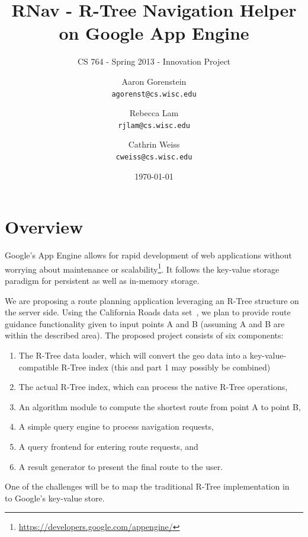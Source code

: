 \documentclass{scrartcl}
\newcommand{\email}[1]{\texttt{#1}}
\begin{document}
\title{RNav - R-Tree Navigation Helper on Google App Engine}
\subtitle{CS 764 - Spring 2013 - Innovation Project}

\author{
Aaron Gorenstein\\
	\email{agorenst@cs.wisc.edu}
\and
Rebecca Lam\\
	\email{rjlam@cs.wisc.edu}
\and
Cathrin Weiss\\
	\email{cweiss@cs.wisc.edu}       
}

\date{\today}

\maketitle

\section{Overview}
\label{sec:intro}
Google's App Engine allows for rapid development of web applications without worrying about maintenance or scalability\footnote{\url{https://developers.google.com/appengine/}}. It follows the key-value storage paradigm for persistent as well as in-memory storage.

We are proposing a route planning application leveraging an R-Tree structure on the server side. Using the California Roads data set~\cite{Online:cardata}, we plan to provide route guidance functionality given to input points A and B (assuming A and B are within the described area). The proposed project consists of six components:
\begin{enumerate}
\item The R-Tree data loader, which will convert the geo data into a key-value-compatible R-Tree index (this and part 1 may possibly be combined)
\item The actual R-Tree index, which can process the native R-Tree operations,
\item An algorithm module to compute the shortest route from point A to point B,
\item A simple query engine to process navigation requests, 
\item A query frontend for entering route requests, and
\item A result generator to present the final route to the user. 
\end{enumerate}
One of the challenges will be to map the traditional R-Tree implementation in~\cite{DBLP:conf/sigmod/Guttman84} to Google's key-value store. 
\end{document}
